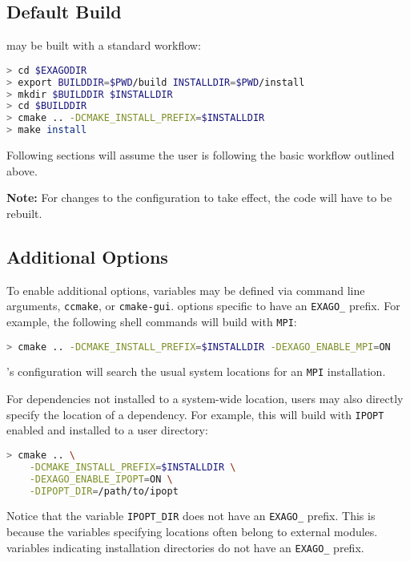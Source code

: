 \subsection{Default Build}

\exago may be built with a standard \cmake workflow:

\begin{lstlisting}[language=bash,caption={Example \cmake workflow}]
> cd $EXAGODIR
> export BUILDDIR=$PWD/build INSTALLDIR=$PWD/install
> mkdir $BUILDDIR $INSTALLDIR
> cd $BUILDDIR
> cmake .. -DCMAKE_INSTALL_PREFIX=$INSTALLDIR
> make install
\end{lstlisting}

Following sections will assume the user is following the basic workflow outlined above.

\textbf{Note:} For changes to the \cmake configuration to take effect, the code will have to be rebuilt.

\subsection{Additional Options}

To enable additional options, \cmake variables may be defined via \cmake command line arguments, \texttt{ccmake}, or \texttt{cmake-gui}.
\cmake options specific to \exago have an \texttt{EXAGO\_} prefix.
For example, the following shell commands will build \exago with \texttt{MPI}:

\begin{lstlisting}[language=bash]
> cmake .. -DCMAKE_INSTALL_PREFIX=$INSTALLDIR -DEXAGO_ENABLE_MPI=ON
\end{lstlisting}

\exago's \cmake configuration will search the usual system locations for an \texttt{MPI} installation.

For dependencies not installed to a system-wide location, users may also directly specify the location of a dependency.
For example, this will build \exago with \texttt{IPOPT} enabled and installed to a user directory:

\begin{lstlisting}[language=bash]
> cmake .. \
    -DCMAKE_INSTALL_PREFIX=$INSTALLDIR \
    -DEXAGO_ENABLE_IPOPT=ON \
    -DIPOPT_DIR=/path/to/ipopt
\end{lstlisting}

Notice that the \cmake variable \texttt{IPOPT\_DIR} does not have an \texttt{EXAGO\_} prefix.
This is because the variables specifying locations often belong to external \cmake modules.
\cmake variables indicating installation directories do not have an \texttt{EXAGO\_} prefix.

